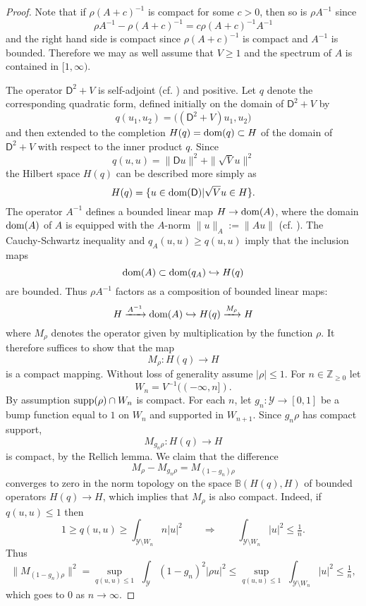 \documentclass[11pt,reqno]{amsart}
\theoremstyle{definition}
\theoremstyle{remark}
\newcommand{\st}[1]{\mathsf{#1}}
\def\Y{\ensuremath{\mathcal{Y}}}
\def\bZ{\ensuremath{\mathbb{Z}}}
\def\bB{\ensuremath{\mathbb{B}}}
\def\supp{\ensuremath{\textnormal{supp}}}
\def\dom{\ensuremath{\textnormal{dom}}}
\begin{document}
\begin{proof}
Note that if $\rho(A+c)^{-1}$ is compact for some $c>0$, then so is $\rho A^{-1}$ since
\[ \rho A^{-1}-\rho(A+c)^{-1}=c\rho(A+c)^{-1}A^{-1}\]
and the right hand side is compact since $\rho(A+c)^{-1}$ is compact and $A^{-1}$ is bounded.  Therefore we may as well assume that $V \ge 1$ and the spectrum of $A$ is contained in $[1,\infty)$.

The operator $\st{D}^2+V$ is self-adjoint (cf. \cite[Theorem 4.6]{ChernoffSchrodinger}) and positive.  Let $q$ denote the corresponding quadratic form, defined initially on the domain of $\st{D}^2+V$ by
\[ q(u_1,u_2)=\big((\st{D}^2+V)u_1,u_2\big)\]
and then extended to the completion $H(q)=\dom(q) \subset H$ of the domain of $\st{D}^2+V$ with respect to the inner product $q$.  Since
\[ q(u,u)=\|\st{D}u\|^2+\|\sqrt{V}u\|^2\]
the Hilbert space $H(q)$ can be described more simply as
\[ H(q)=\{u \in \dom(\st{D})|\sqrt{V}u \in H\}.\]
The operator $A^{-1}$ defines a bounded linear map $H \rightarrow \dom(A)$, where the domain $\dom(A)$ of $A$ is equipped with the $A$-norm $\|u\|_A:=\|Au\|$ (cf. \cite[VIII]{ReedSimonI}).  The Cauchy-Schwartz inequality and $q_A(u,u)\ge q(u,u)$ imply that the inclusion maps
\[ \dom(A) \subset \dom(q_A) \hookrightarrow H(q) \]
are bounded.  Thus $\rho A^{-1}$ factors as a composition of bounded linear maps:
\[ H \xrightarrow{A^{-1}}\dom(A) \hookrightarrow H(q) \xrightarrow{M_\rho} H\]
where $M_\rho$ denotes the operator given by multiplication by the function $\rho$.  It therefore suffices to show that the map
\[ M_\rho \colon H(q) \rightarrow H \]
is a compact mapping.  Without loss of generality assume $|\rho|\le 1$.  For $n \in \bZ_{\ge 0}$ let 
\[ W_n=V^{-1}((-\infty,n]).\] 
By assumption $\supp(\rho)\cap W_n$ is compact.  For each $n$, let $g_n:\Y \rightarrow [0,1]$ be a bump function equal to $1$ on $W_n$ and supported in $W_{n+1}$.  Since $g_n\rho$ has compact support, 
\[ M_{g_n\rho}\colon H(q) \rightarrow H\]
is compact, by the Rellich lemma.  We claim that the difference
\[ M_\rho-M_{g_n\rho}=M_{(1-g_n)\rho} \]
converges to zero in the norm topology on the space $\bB(H(q),H)$ of bounded operators $H(q) \rightarrow H$, which implies that $M_\rho$ is also compact.  Indeed, if $q(u,u)\le 1$ then
\[ 1 \ge q(u,u) \ge \int_{\Y \setminus W_n} n|u|^2 \qquad \Rightarrow \qquad \int_{\Y \setminus W_n}|u|^2 \le \tfrac{1}{n}.\]
Thus
\[ \|M_{(1-g_n)\rho}\|^2=\sup_{q(u,u)\le 1} \, \, \int_{\Y} (1-g_n)^2|\rho u|^2 \le \sup_{q(u,u)\le 1} \, \, \int_{\Y \setminus W_{n}}|u|^2 \le \tfrac{1}{n},\]
which goes to $0$ as $n \rightarrow \infty$.
\end{proof}
\end{document}
